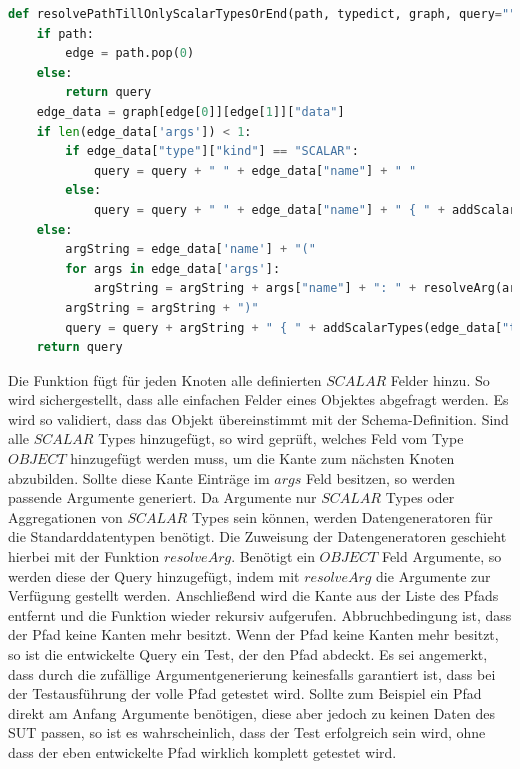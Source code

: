 \begin{lstlisting}[language=Python,caption={Pfadumwandlung in Query}, label={respath}]
def resolvePathTillOnlyScalarTypesOrEnd(path, typedict, graph, query=""):
    if path:
        edge = path.pop(0)
    else:
        return query
    edge_data = graph[edge[0]][edge[1]]["data"]
    if len(edge_data['args']) < 1:
        if edge_data["type"]["kind"] == "SCALAR":
            query = query + " " + edge_data["name"] + " "
        else:
            query = query + " " + edge_data["name"] + " { " + addScalarTypes(edge_data["type"], typedict, edge_data["name"]) + " " + resolvePathTillOnlyScalarTypesOrEnd(path, typedict, graph, query) + " } "
    else:
        argString = edge_data['name'] + "("
        for args in edge_data['args']:
            argString = argString + args["name"] + ": " + resolveArg(args["type"], typedict) + ", "
        argString = argString + ")"
        query = query + argString + " { " + addScalarTypes(edge_data["type"], typedict, edge_data["name"]) + " " + resolvePathTillOnlyScalarTypesOrEnd(path, typedict, graph, query) + " } "
    return query
\end{lstlisting}

Die Funktion fügt für jeden Knoten alle definierten $SCALAR$ Felder hinzu.
So wird sichergestellt, dass alle einfachen Felder eines Objektes abgefragt werden.
Es wird so validiert, dass das Objekt übereinstimmt mit der Schema-Definition.
Sind alle $SCALAR$ Types hinzugefügt, so wird geprüft, welches Feld vom Type $OBJECT$ hinzugefügt werden muss, um die Kante zum nächsten Knoten abzubilden.
Sollte diese Kante Einträge im $args$ Feld besitzen, so werden passende Argumente generiert.
Da Argumente nur $SCALAR$ Types oder Aggregationen von $SCALAR$ Types sein können, werden Datengeneratoren für die Standarddatentypen benötigt.
Die Zuweisung der Datengeneratoren geschieht hierbei mit der Funktion $resolveArg$.
Benötigt ein $OBJECT$ Feld Argumente, so werden diese der Query hinzugefügt, indem mit $resolveArg$ die Argumente zur Verfügung gestellt werden.
Anschließend wird die Kante aus der Liste des Pfads entfernt und die Funktion wieder rekursiv aufgerufen.
Abbruchbedingung ist, dass der Pfad keine Kanten mehr besitzt.
Wenn der Pfad keine Kanten mehr besitzt, so ist die entwickelte Query ein Test, der den Pfad abdeckt.
Es sei angemerkt, dass durch die zufällige Argumentgenerierung keinesfalls garantiert ist, dass bei der Testausführung der volle Pfad getestet wird.
Sollte zum Beispiel ein Pfad direkt am Anfang Argumente benötigen, diese aber jedoch zu keinen Daten des SUT passen, so ist es wahrscheinlich,
dass der Test erfolgreich sein wird, ohne dass der eben entwickelte Pfad wirklich komplett getestet wird.
\newpage

